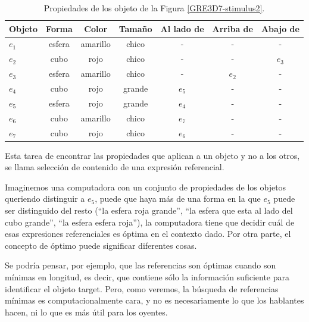\begin{table}[h!]
\begin{center}
\begin{tabular}{|l|c|c|c|c|c|c|}
\hline
Objeto& 	Forma		&	Color	&	Tama\~no & Al lado de & Arriba de	& Abajo de	\\
\hline
$e_1$ & esfera & amarillo & chico & - & - & -\\
$e_2$ & cubo & rojo & chico & - & - & $e_3$\\
$e_3$ & esfera & amarillo & chico & - & $e_2$ & -\\
$e_4$ & cubo & rojo & grande & $e_5$ & - & -\\
$e_5$ & esfera & rojo & grande & $e_4$ & - & -\\
$e_6$ & cubo & amarillo & chico & $e_7$ & - & -\\
$e_7$ & cubo & rojo & chico & $e_6$ & - & -\\

\hline
\end{tabular}
\caption{Propiedades de los objeto de la Figura \ref{GRE3D7-stimulus2}.}
\vspace*{-.5cm}
\label{tabla-propiedades}
\end{center}
\end{table}


Esta tarea de encontrar las propiedades que aplican a un objeto y no a los otros, se llama selecci\'on de contenido de una expresi\'on referencial.  

Imaginemos una computadora con un conjunto de propiedades de los objetos queriendo distinguir a $e_5$, puede que haya m\'as de una forma en la que $e_5$ puede ser distinguido del resto (``la esfera roja grande'', ``la esfera que esta al lado del cubo grande'', ``la esfera esfera roja''), la computadora tiene que decidir cu\'al de esas expresiones referenciales es \'optima en el contexto dado. Por otra parte, el concepto de \'optimo puede significar diferentes cosas.

Se podr\'{i}a pensar, por ejemplo, que las referencias son \'optimas cuando son m\'{i}nimas en longitud, es decir, 
que contiene s\'olo la informaci\'on suficiente para identificar el objeto target. Pero, como veremos, la b\'usqueda de referencias m\'{i}nimas
es computacionalmente cara, y no es necesariamente lo que los hablantes hacen, ni lo que es m\'as \'util para los oyentes.


